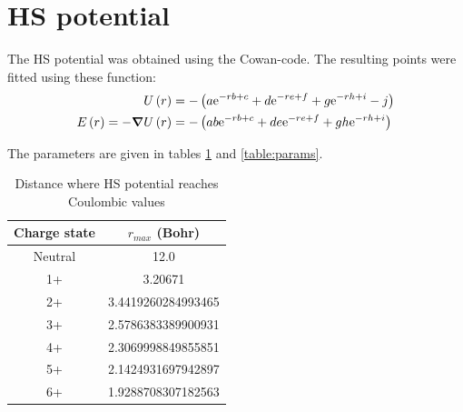 \documentclass[12pt,letterpaper]{article}
\title{\mytitle}
\date{}
\author{Nicolas Bigaouette}
\begin{document}
\maketitle

\tableofcontents



\section{HS potential}
The HS potential was obtained using the Cowan-code. The resulting points were fitted using these function:
\begin{subequations}
\begin{align}
U\left( r \right) & = - \left(  a   \textrm{e}^{-r b + c} + d   \textrm{e}^{-r e + f} + g   \textrm{e}^{-r h + i} - j  \right) \\
E\left( r \right) = -\bm{\nabla} U\left( r \right) & = - \left(  a b \textrm{e}^{-r b + c} + d e \textrm{e}^{-r e + f} + g h \textrm{e}^{-r h + i}  \right)
\end{align}
\label{eqn:HS:fit}
\end{subequations}

The parameters are given in tables \ref{table:rmax} and \ref{table:params}.

\begin{table}
\begin{center}
\begin{tabular}{|c|c|} \hline
Charge state    & $r_{max}$ (Bohr)      \\ \hline \hline
Neutral         & 12.0                  \\ \hline
1+              & 3.20671               \\ \hline
2+              & 3.4419260284993465    \\ \hline
3+              & 2.5786383389900931    \\ \hline
4+              & 2.3069998849855851    \\ \hline
5+              & 2.1424931697942897    \\ \hline
6+              & 1.9288708307182563    \\ \hline
\end{tabular}
\end{center}
\caption{\label{table:rmax}Distance where HS potential reaches Coulombic values}
\end{table}
\end{document}
